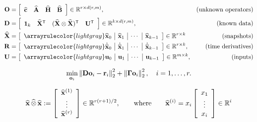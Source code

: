 \documentclass[12 pt]{article}
\begin{document}
\begin{align*}
    \Ops
    &= \left[\begin{array}{cccc}
        \crom &
        \Arom &
        \Hrom &
        \Brom
    \end{array}\right]\in\RR^{r\times d(r,m)},
    &\text{(unknown operators)}
    \\
    \mathbf{D}
    &= \left[\begin{array}{cccc}
        \ones &
        \Xrom\trp &
        (\Xrom\otimes\Xrom)\trp &
        \mathbf{U}\trp
    \end{array}\right]\in\RR^{k\times d(r,m)},
    &\text{(known data)}
    \\
    \Xrom
    &= \left[\begin{array}{c|c|c|c}
        \arrayrulecolor{lightgray}
        \xrom_0 & \xrom_1 & \cdots & \xrom_{k-1} \\
    \end{array}\right]\in\RR^{r\times k}
    &\text{(snapshots)}
    \\
    \Rhs
    &= \left[\begin{array}{c|c|c|c}
        \arrayrulecolor{lightgray}
        \dxrom_0 & \dxrom_1 & \cdots & \dxrom_{k-1} \\
    \end{array}\right]\in\RR^{r\times k},
    &\text{(time derivatives)}
    \\
    \Ufom
    &= \left[\begin{array}{c|c|c|c}
        \arrayrulecolor{lightgray}
        \ufom_0 & \ufom_1 & \cdots & \ufom_{k-1} \\
    \end{array}\right]\in\RR^{m\times k},
    &\text{(inputs)}
\end{align*}

\begin{align*}
    \min_{\mathbf{o}_i}
    \left\|\mathbf{D}\mathbf{o}_i - \mathbf{r}_i\right\|_2^2 + \left\|\boldsymbol{\Gamma}\mathbf{o}_i\right\|_2^2,
    \quad
    i = 1,\ldots, r.
\end{align*}

\begin{align*}
    \widehat{\mathbf{x}}\, \widehat{\otimes}\, \widehat{\mathbf{x}}
    := \left[\begin{array}{c}
        \widehat{\mathbf{x}}^{(1)} \\ \vdots \\ \widehat{\mathbf{x}}^{(r)}
    \end{array}\right]\in\mathbb{R}^{r(r+1)/2},
    \qquad\text{where}\qquad
    \widehat{\mathbf{x}}^{(i)}
    = x_i \left[\begin{array}{c}
        x_1 \\ \vdots \\ x_i
    \end{array}\right]\in\mathbb{R}^{i}
\end{align*}
\end{document}
